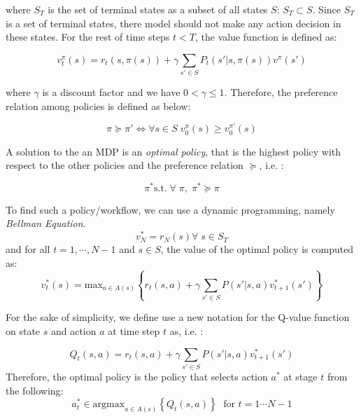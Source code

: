 \documentclass[10pt,journal,compsoc]{IEEEtran}
\begin{document}
where $S_T$ is the set of terminal states as a subset of all states $S$: $S_T \subset S$. Since $S_T$ is a set of terminal states, there model should not make any action decision in these states. For the rest of time steps $t<T$, the value function is defined as:

\begin{equation}\label{eq:value-func}
v^{\pi}_t(s) =  r_t(s,\pi(s)) + \gamma \sum_{s' \in S} P_t(s'|s,\pi(s)) v^{\pi}(s')
\end{equation}

where $\gamma$ is a discount factor and we have $ 0 < \gamma \leq 1$. 
Therefore, the preference relation among policies is defined as below:

\begin{equation}
\pi \succeq \pi' \Leftrightarrow \forall s \in S \; v_0^{\pi}(s) \geq v_0^{\pi'}(s)
\end{equation}

A solution to the an MDP is an \emph{optimal policy}, that is the highest policy with respect to the other policies and the preference relation $\succeq$, i.e. : 

\begin{equation}
\pi^* \text{s.t.} \; \forall \; \pi, \; \pi^* \succeq \pi
\end{equation}

To find such a policy/workflow, we can use a dynamic programming, namely \emph{Bellman Equation}. 
\begin{equation}
v_N^* = r_N(s) \forall \; s\in S_T
\end{equation}
%
and for all $t= 1, \cdots, N-1$ and $s \in S$, the value of the optimal policy is computed as:
\begin{equation}\label{eq:bellman}
v_t^*(s) =\text{max}_{a \in A(s)} \left \{ r_t(s,a) + \gamma \sum_{s' \in S} P(s'|s,a) v_{t+1}^*(s') \right \} 
\end{equation}

For the sake of simplicity, we define use a new notation for the Q-value function on state $s$ and action $a$ at time step $t$ as, i.e. :

\begin{equation}
Q_t(s,a) = r_t(s,a) + \gamma \sum_{s' \in S} P(s'|s,a) v_{t+1}^*(s')
\end{equation}
Therefore, the optimal policy is the policy that selects action $a^*$ at stage $t$ from the following:
\begin{equation}\label{eq:opt-action}
a^*_t \in \text{argmax}_{a \in A(s)} \left \{ Q_t(s,a) \right \} \; \text{ for } t=1 \cdots N-1
\end{equation}
\end{document}
